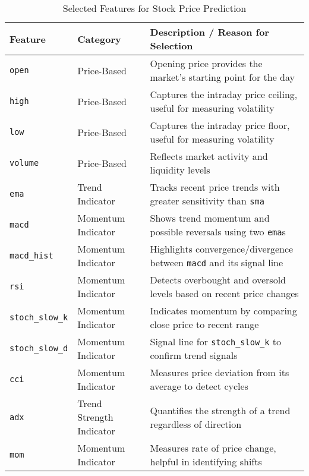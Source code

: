 \begin{table}[H]
\centering
\caption{Selected Features for Stock Price Prediction}
\label{tab:app-selected-features}
\begin{tabular}{llp{6cm}}
\hline
\textbf{Feature}            & \textbf{Category}              & \textbf{Description / Reason for Selection} \\ \hline\hline
\texttt{open}               & Price-Based                    & Opening price provides the market's starting point for the day \\ 
\texttt{high}               & Price-Based                    & Captures the intraday price ceiling, useful for measuring volatility \\ 
\texttt{low}                & Price-Based                    & Captures the intraday price floor, useful for measuring volatility \\ 
\texttt{volume}             & Price-Based                    & Reflects market activity and liquidity levels \\ 
\texttt{ema}                & Trend Indicator                & Tracks recent price trends with greater sensitivity than \texttt{sma} \\ 
\texttt{macd}               & Momentum Indicator             & Shows trend momentum and possible reversals using two \texttt{ema}s \\ 
\texttt{macd\_hist}         & Momentum Indicator             & Highlights convergence/divergence between \texttt{macd} and its signal line \\ 
\texttt{rsi}                & Momentum Indicator             & Detects overbought and oversold levels based on recent price changes \\ 
\texttt{stoch\_slow\_k}     & Momentum Indicator             & Indicates momentum by comparing close price to recent range \\ 
\texttt{stoch\_slow\_d}     & Momentum Indicator             & Signal line for \texttt{stoch\_slow\_k} to confirm trend signals \\ 
\texttt{cci}                & Momentum Indicator             & Measures price deviation from its average to detect cycles \\ 
\texttt{adx}                & Trend Strength Indicator       & Quantifies the strength of a trend regardless of direction \\ 
\texttt{mom}                & Momentum Indicator             & Measures rate of price change, helpful in identifying shifts \\ 

\end{tabular}
\end{table}
